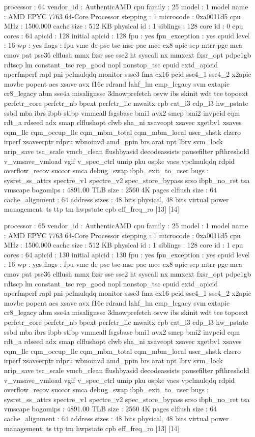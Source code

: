 processor	: 64
vendor_id	: AuthenticAMD
cpu family	: 25
model		: 1
model name	: AMD EPYC 7763 64-Core Processor
stepping	: 1
microcode	: 0xa0011d5
cpu MHz		: 1500.000
cache size	: 512 KB
physical id	: 1
siblings	: 128
core id		: 0
cpu cores	: 64
apicid		: 128
initial apicid	: 128
fpu		: yes
fpu_exception	: yes
cpuid level	: 16
wp		: yes
flags		: fpu vme de pse tsc msr pae mce cx8 apic sep mtrr pge mca cmov pat pse36 clflush mmx fxsr sse sse2 ht syscall nx mmxext fxsr_opt pdpe1gb rdtscp lm constant_tsc rep_good nopl nonstop_tsc cpuid extd_apicid aperfmperf rapl pni pclmulqdq monitor ssse3 fma cx16 pcid sse4_1 sse4_2 x2apic movbe popcnt aes xsave avx f16c rdrand lahf_lm cmp_legacy svm extapic cr8_legacy abm sse4a misalignsse 3dnowprefetch osvw ibs skinit wdt tce topoext perfctr_core perfctr_nb bpext perfctr_llc mwaitx cpb cat_l3 cdp_l3 hw_pstate ssbd mba ibrs ibpb stibp vmmcall fsgsbase bmi1 avx2 smep bmi2 invpcid cqm rdt_a rdseed adx smap clflushopt clwb sha_ni xsaveopt xsavec xgetbv1 xsaves cqm_llc cqm_occup_llc cqm_mbm_total cqm_mbm_local user_shstk clzero irperf xsaveerptr rdpru wbnoinvd amd_ppin brs arat npt lbrv svm_lock nrip_save tsc_scale vmcb_clean flushbyasid decodeassists pausefilter pfthreshold v_vmsave_vmload vgif v_spec_ctrl umip pku ospke vaes vpclmulqdq rdpid overflow_recov succor smca debug_swap ibpb_exit_to_user
bugs		: sysret_ss_attrs spectre_v1 spectre_v2 spec_store_bypass srso ibpb_no_ret tsa vmscape
bogomips	: 4891.00
TLB size	: 2560 4K pages
clflush size	: 64
cache_alignment	: 64
address sizes	: 48 bits physical, 48 bits virtual
power management: ts ttp tm hwpstate cpb eff_freq_ro [13] [14]

processor	: 65
vendor_id	: AuthenticAMD
cpu family	: 25
model		: 1
model name	: AMD EPYC 7763 64-Core Processor
stepping	: 1
microcode	: 0xa0011d5
cpu MHz		: 1500.000
cache size	: 512 KB
physical id	: 1
siblings	: 128
core id		: 1
cpu cores	: 64
apicid		: 130
initial apicid	: 130
fpu		: yes
fpu_exception	: yes
cpuid level	: 16
wp		: yes
flags		: fpu vme de pse tsc msr pae mce cx8 apic sep mtrr pge mca cmov pat pse36 clflush mmx fxsr sse sse2 ht syscall nx mmxext fxsr_opt pdpe1gb rdtscp lm constant_tsc rep_good nopl nonstop_tsc cpuid extd_apicid aperfmperf rapl pni pclmulqdq monitor ssse3 fma cx16 pcid sse4_1 sse4_2 x2apic movbe popcnt aes xsave avx f16c rdrand lahf_lm cmp_legacy svm extapic cr8_legacy abm sse4a misalignsse 3dnowprefetch osvw ibs skinit wdt tce topoext perfctr_core perfctr_nb bpext perfctr_llc mwaitx cpb cat_l3 cdp_l3 hw_pstate ssbd mba ibrs ibpb stibp vmmcall fsgsbase bmi1 avx2 smep bmi2 invpcid cqm rdt_a rdseed adx smap clflushopt clwb sha_ni xsaveopt xsavec xgetbv1 xsaves cqm_llc cqm_occup_llc cqm_mbm_total cqm_mbm_local user_shstk clzero irperf xsaveerptr rdpru wbnoinvd amd_ppin brs arat npt lbrv svm_lock nrip_save tsc_scale vmcb_clean flushbyasid decodeassists pausefilter pfthreshold v_vmsave_vmload vgif v_spec_ctrl umip pku ospke vaes vpclmulqdq rdpid overflow_recov succor smca debug_swap ibpb_exit_to_user
bugs		: sysret_ss_attrs spectre_v1 spectre_v2 spec_store_bypass srso ibpb_no_ret tsa vmscape
bogomips	: 4891.00
TLB size	: 2560 4K pages
clflush size	: 64
cache_alignment	: 64
address sizes	: 48 bits physical, 48 bits virtual
power management: ts ttp tm hwpstate cpb eff_freq_ro [13] [14]

